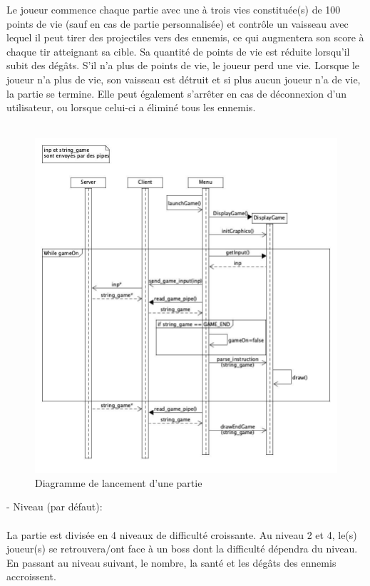 \documentclass[a4paper,12pt]{article}
\begin{document}
Le joueur commence chaque partie avec une à trois vies constituée(s) de 100 points de vie (sauf en cas de partie personnalisée) et
contrôle un vaisseau avec lequel il peut tirer des projectiles vers des ennemis, ce qui 
augmentera son score à chaque tir atteignant sa cible. Sa quantité de points de vie est réduite
lorsqu’il subit des dégâts. S’il n’a plus de points de vie, le joueur perd une vie. Lorsque le 
joueur n’a plus de vie, son vaisseau est détruit et si plus aucun joueur n’a de vie, la partie se 
termine. Elle peut également s’arrêter en cas de déconnexion d’un utilisateur, ou lorsque celui-ci a éliminé tous les ennemis.\\
\\
\begin{figure}
\centering
\includegraphics[scale=0.5]{images/launch_game_sequence_diagram.jpg}
\caption{Diagramme de lancement d'une partie}
\end{figure}


- Niveau (par défaut):\\ \\
La partie est divisée en 4 niveaux de difficulté croissante. Au niveau 2 et 4, le(s) joueur(s) se retrouvera/ont face à un boss dont la difficulté dépendra du niveau. En passant au niveau suivant, le nombre, la santé et 
les dégâts des ennemis accroissent.\\
\end{document}
